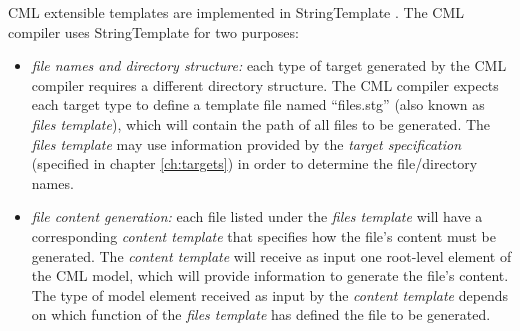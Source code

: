 CML extensible templates are implemented in StringTemplate \cite{st}.  The CML compiler uses StringTemplate for two purposes:

\begin{itemize}
\item \emph{file names and directory structure:}
each type of target generated by the CML compiler requires a different directory structure.
The CML compiler expects each target type to define a template file named ``files.stg'' (also known as \emph{files template}),
which will contain the path of all files to be generated. The \emph{files template} may use information provided by the \emph{target specification} (specified in chapter \ref{ch:targets}) in order to determine the file/directory names.
\item \emph{file content generation:}
each file listed under the \emph{files template} will have a corresponding \emph{content template} that specifies how the file's content must be generated. The \emph{content template} will receive as input one root-level element of the CML model, which will provide information to generate the file's content. The type of model element received as input by the \emph{content template} depends on which function of the \emph{files template} has defined the file to be generated.
\end{itemize}

